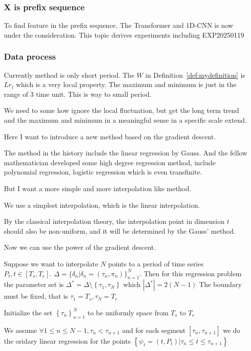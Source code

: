 \documentclass{article}
\theoremstyle{definition} %
\begin{document}
\subsubsection{X is prefix sequence}
To find feature in the prefix sequence. The
Transformer and 1D-CNN is now under
the consideration.
This topic derives experiments including
EXP20250119

\subsubsection{Data process}
Currently method is only short period.
The $W$ in Definition~\ref{def:mydefinition}
is $Lr_t$ which is a very local property.
The maximum and minimum is just in the range
of $3$ time unit. This is way to small period.

We need to some how ignore the local fluctuation,
but get the long term trend and the maximum
and minimum in a meaningful sense in
a specific scale extend.

Here I want to introduce a new method based
on the gradient descent.

The method in the history include the
linear regression by Gauss. And the fellow
mathematician developed some high degree
regression method, include polynomial regression,
logistic regression which is even transfinite.

But I want a more simple and more interpolation
like method.

We use a simplest interpolation, which is
the linear interpolation.

By the classical interpolation theory,
the interpolation point in dimension
$t$ should also be non-uniform, and it
will be determined by the Gauss' method.

Now we can use the power of the gradient
descent.

Suppose we want to interpolate $N$ points
to a period of time series
$P_t,t\in\left[T_s,T_e\right]$.
$\Delta=\{\delta_n|\delta_n=
    (\tau_n,\pi_n)\}_{n=1}^N$.
Then for this regression problem the
parameter set is
$\Delta^*=\Delta\setminus\left\{\tau_1,\tau_N\right\}$ which
$
    \left|
    \Delta^*
    \right|=2\left(N-1\right)
$
The boundary must be fixed, that is
$\tau_1=T_s,\tau_N=T_e$

Initialize the set
$\left\{\tau_n\right\}_{n=1}^N$
to be uniformly space from $T_s$ to $T_e$

We assume
$\forall 1\leq n\leq N-1,\tau_n<\tau_{n+1}$
and for each segment
$\left[\tau_n,\tau_{n+1}\right]$
we do the oridary linear regression
for the points
$\left\{\psi_t=\left(t,P_t\right)|
    \tau_n\leq t\leq\tau_{n+1}\right\}$
\end{document}

